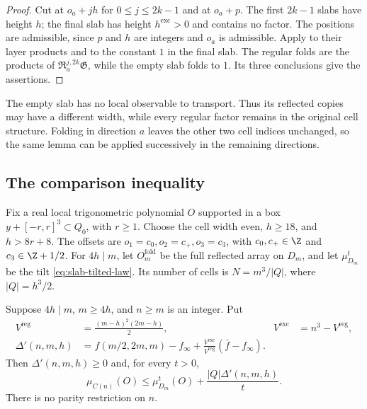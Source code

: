 \begin{proof}
Cut at $o_a+jh$ for $0\le j\le2k-1$ and at $o_a+p$.
The first $2k-1$ slabs have height $h$; the final slab has height
$h^{\mathrm{exc}}>0$ and contains no factor. The positions are
admissible, since $p$ and $h$ are integers and $o_a$ is admissible.
Apply  to their layer products
and to the constant $1$ in the final slab. The regular folds are
the products of $\mathfrak R_a^{j,2k}\mathfrak G$, while the empty
slab folds to $1$. Its three conclusions give the assertions.
\end{proof}

The empty slab has no local observable to transport. Thus its reflected
copies may have a different width, while every regular factor remains
in the original cell structure. Folding in direction $a$ leaves the
other two cell indices unchanged, so the same lemma can be applied
successively in the remaining directions.

\subsection{The comparison inequality}

Fix a real local trigonometric polynomial $O$ supported in a box
$y+[-r,r]^3\subset Q_0$, with $r\ge1$. Choose the cell width even,
$h\ge18$, and $h>8r+8$. The offsets are
$o_1=c_0,o_2=c_+,o_3=c_3$, with $c_0,c_+\in\Z$ and
$c_3\in\Z+1/2$. For $4h\mid m$, let $O_m^{\mathrm{fold}}$ be
the full reflected array on $D_m$, and let $\mu_{D_m}^t$ be the
tilt \eqref{eq:slab-tilted-law}. Its number of cells is
$N=m^3/|Q|$, where $|Q|=h^3/2$.

\begin{proposition}\label{prop:fold-any-side}
Suppose $4h\mid m$, $m\ge4h$, and $n\ge m$ is an integer.
Put
\begin{align*}
 V^{\mathrm{reg}}&=\frac{(m-h)^2(2m-h)}2,
 &V^{\mathrm{exc}}&=n^3-V^{\mathrm{reg}},\\
 \Delta'(n,m,h)&=f(m/2,2m,m)-f_\infty
       +\frac{V^{\mathrm{exc}}}{V^{\mathrm{reg}}}
                     (\bar f-f_\infty).
\end{align*}
Then $\Delta'(n,m,h)\ge0$ and, for every $t>0$,
\begin{equation}\label{eq:sides-expectation-comparison}
 \mu_{C(n)}(O)\le\mu_{D_m}^t(O)
                   +\frac{|Q|\Delta'(n,m,h)}t.
\end{equation}
There is no parity restriction on $n$.
\end{proposition}

